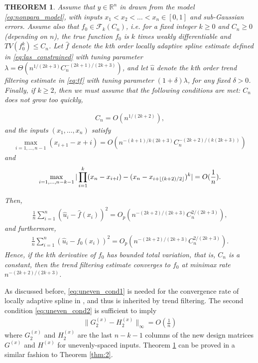 \documentclass[a4paper]{article}
\DeclarePairedDelimiter\floor{\lfloor}{\rfloor}
\newtheorem{theorem}{THEOREM}
\newcommand{\RR}{\mathbb{R}}
\renewcommand{\cal}{\mathcal}
\begin{document}
\begin{theorem}
Assume that $y\in\RR^n$ in drawn from the model \eqref{eq:nonpara_model}, with inputs $x_1<x_2<\ldots<x_n\in[0,1]$ and sub-Gaussian errors. Assume also that $f_0\in\cal{F}_k(C_n)$, i.e. for a fixed integer $k\geq 0$ and $C_n\geq 0$ (depending on $n$), the true function $f_0$ is $k$ times weakly differentiable and $TV(f_0^{k})\leq C_n$. Let $\hat{f}$ denote the $k$th order locally adaptive spline estimate defined in \eqref{eq:las_constrained} with tuning parameter $\lambda = \Theta(n^{1/(2k+3)}C_n^{-(2k+1)/(2k+3)})$, and let $\hat{u}$ denote the $k$th order trend filtering estimate in \eqref{eq:tf} with tuning parameter $(1+\delta)\lambda$, for any fixed $\delta >0$. Finally, if $k\geq 2$, then we must assume that the following conditions are met: $C_n$ does not grow too quickly,

\begin{align*}
C_n = O(n^{1/(2k+2)}),
\end{align*}
and the inputs $(x_1,\ldots, x_n)$ satisfy
\begin{align}
\max_{i=1,\ldots, n-1} (x_{i+1}-x+i) = O(n^{-(k+1)/k(2k+3)}C_n^{-(2k+2)/(k(2k+3))})
\label{eq:uneven_cond1}
\end{align}
and
\begin{align}
\max_{i=1,\ldots,n-k-1} |\prod_{i=1}^k(x_n-x_{i+l}) - (x_n-x_{i+\floor{(k+2)/2}})^k| = O(\frac{1}{n}).
\label{eq:uneven_cond2}
\end{align}

Then, 
\begin{align*}
\frac{1}{n}\sum_{i=1}^n (\hat{u}_i - \hat{f}(x_i))^2 = O_p(n^{-(2k+2)/(2k+3)}C_n^{2/(2k+3)}),
\end{align*}
and furthermore,
\begin{align*}
\frac{1}{n}\sum_{i=1}^n (\hat{u}_i-f_0(x_i))^2 = O_p(n^{-(2k+2)/(2k+3)}C_n^{2/(2k+3)}).
\end{align*}
Hence, if the $k$th derivative of $f_0$ has bounded total variation, that is, $C_n$ is a constant, then the trend filtering estimate converges to $f_0$ at minimax rate $n^{-(2k+2)/(2k+3)}$.
\label{thm:3}
\end{theorem}

As discussed before, \eqref{eq:uneven_cond1} is needed for the convergence rate of locally adaptive spline in \cite{mammen1997locally}, and thus is inherited by trend filtering. The second condition \eqref{eq:uneven_cond2} is sufficient to imply
\begin{align*}
\|G_2^{(x)} - H_2^{(x)}\|_\infty = O(\frac{1}{n})
\end{align*}
where $G_2^{(x)}$ and $H_2^{(x)}$ are the last $n-k-1$ columns of the new design matrices $G^{(x)}$ and $H^{(x)}$ for unevenly-spaced inputs. Theorem \ref{thm:3} can be proved in a similar fashion to Theorem \ref{thm:2}.
\end{document}
